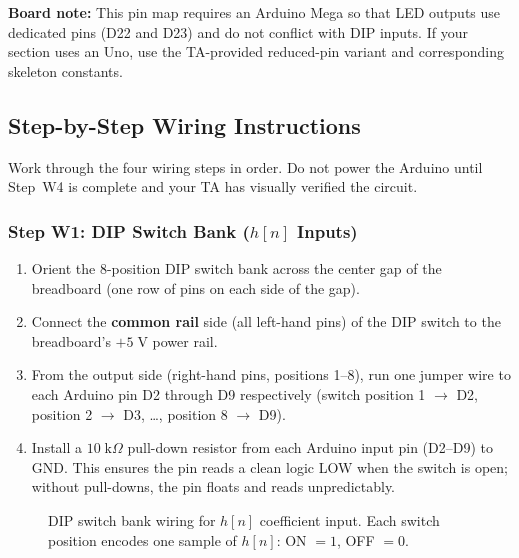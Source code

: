 \documentclass[11pt,letterpaper]{article}
\begin{document}
\noindent\textbf{Board note:} This pin map requires an Arduino Mega so that LED outputs use dedicated pins (D22 and D23) and do not conflict with DIP inputs. If your section uses an Uno, use the TA-provided reduced-pin variant and corresponding skeleton constants.

\clearpage

\subsection{Step-by-Step Wiring Instructions}

Work through the four wiring steps in order. Do not power the Arduino until Step~W4 is complete and your TA has visually verified the circuit.

\subsubsection{Step W1: DIP Switch Bank \texorpdfstring{($h[n]$ Inputs)}{(h[n] Inputs)}}

\begin{enumerate}
    \item Orient the 8-position DIP switch bank across the center gap of the breadboard (one row of pins on each side of the gap).
    \item Connect the \textbf{common rail} side (all left-hand pins) of the DIP switch to the breadboard's $+5\;\mathrm{V}$ power rail.
    \item From the output side (right-hand pins, positions 1--8), run one jumper wire to each Arduino pin D2 through D9 respectively (switch position 1 $\to$ D2, position 2 $\to$ D3, \ldots, position 8 $\to$ D9).
    \item Install a $10\;\mathrm{k}\Omega$ pull-down resistor from each Arduino input pin (D2--D9) to GND. This ensures the pin reads a clean logic LOW when the switch is open; without pull-downs, the pin floats and reads unpredictably.
\end{enumerate}

\begin{figure}[H]
    \centering
    \vspace{0.3in}
    \vspace{0.1in}
    \caption{DIP switch bank wiring for $h[n]$ coefficient input. Each switch position encodes one sample of $h[n]$: ON $= 1$, OFF $= 0$.}
    \label{fig:dip_wiring}
\end{figure}
\end{document}

